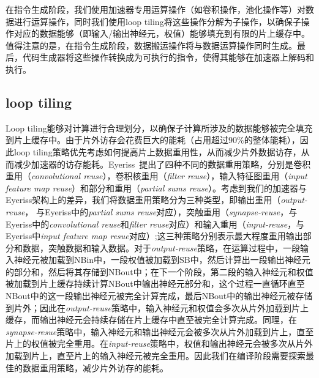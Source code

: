 在指令生成阶段，我们使用加速器专用运算操作（如卷积操作，池化操作等）对数据进行运算操作，同时我们使用loop tiling将这些操作分解为子操作，以确保子操作对应的数据能够（即输入/输出神经元，权值）能够填充到有限的片上缓存中。值得注意的是，在指令生成阶段，数据搬运操作将与数据运算操作同时生成。最后，代码生成器将这些操作转换成为可执行的指令，使得其能够在加速器上解码和执行。


\subsection{loop tiling}

Loop tiling能够对计算进行合理划分，以确保子计算所涉及的数据能够被完全填充到片上缓存中。由于片外访存会花费巨大的能耗（占用超过$90\%$的整体能耗），因此loop tiling策略优先考虑如何提高片上数据重用性，从而减少片外数据访存，从而减少加速器的访存能耗。Eyeriss~\cite{chen2017eyeriss}提出了四种不同的数据重用策略，分别是卷积重用（\emph{convolutional reuse}），卷积核重用（\emph{filter reuse}），输入特征图重用（\emph{input feature map reuse}）和部分和重用（\emph{partial sums reuse}）。考虑到我们的加速器与Eyeriss架构上的差异，我们将数据重用策略分为三种类型，即输出重用（\emph{output-reuse}， 与Eyeriss中的\emph{partial sums reuse}对应），突触重用（\emph{synapse-reuse}，与Eyeriss中的\emph{convolutional reuse}和\emph{filter reuse}对应）和输入重用（\emph{input-reuse}，与Eyeriss中\emph{input feature map resue}对应）;这三种策略分别表示最大程度重用输出部分和数据，突触数据和输入数据。对于\emph{output-reuse}策略，在运算过程中，一段输入神经元被加载到NBin中，一段权值被加载到SB中，然后计算出一段输出神经元的部分和，然后将其存储到NBout中；在下一个阶段，第二段的输入神经元和权值被加载到片上缓存持续计算NBout中输出神经元部分和，这个过程一直循环直至NBout中的这一段输出神经元被完全计算完成，最后NBout中的输出神经元被存储到片外；因此在\emph{output-reuse}策略中，输入神经元和权值会多次从片外加载到片上缓存，而输出神经元会持续存储在片上缓存中直至被完全计算完成。同理，在\emph{synapse-resue}策略中，输入神经元和输出神经元会被多次从片外加载到片上，直至片上的权值被完全重用。在\emph{input-reuse}策略中，权值和输出神经元会被多次从片外加载到片上，直至片上的输入神经元被完全重用。因此我们在编译阶段需要探索最佳的数据重用策略，减少片外访存的能耗。


